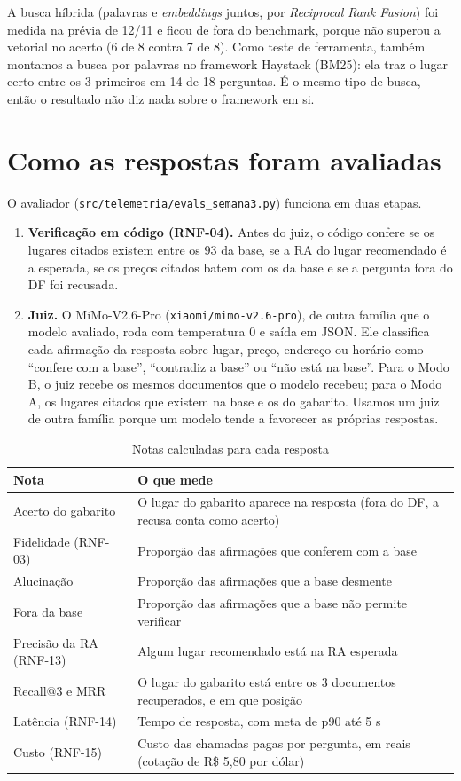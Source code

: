 \documentclass[11pt,a4paper]{article}
\newcommand{\fonte}{\vspace{0.1cm}\flushleft{\footnotesize{Fonte: elaborado pelos autores (2026).}}}
\newcommand{\codigo}[1]{\texttt{\small #1}}
\begin{document}
A busca híbrida (palavras e \textit{embeddings} juntos, por \textit{Reciprocal Rank Fusion}) foi medida na prévia de 12/11 e ficou de fora do benchmark, porque não superou a vetorial no acerto (6 de 8 contra 7 de 8). Como teste de ferramenta, também montamos a busca por palavras no framework Haystack (BM25): ela traz o lugar certo entre os 3 primeiros em 14 de 18 perguntas. É o mesmo tipo de busca, então o resultado não diz nada sobre o framework em si.

\section{Como as respostas foram avaliadas}

O avaliador (\codigo{src/telemetria/evals\_semana3.py}) funciona em duas etapas.

\begin{enumerate}
\item \textbf{Verificação em código (RNF-04).} Antes do juiz, o código confere se os lugares citados existem entre os 93 da base, se a RA do lugar recomendado é a esperada, se os preços citados batem com os da base e se a pergunta fora do DF foi recusada.
\item \textbf{Juiz.} O MiMo-V2.6-Pro (\codigo{xiaomi/mimo-v2.6-pro}), de outra família que o modelo avaliado, roda com temperatura 0 e saída em JSON. Ele classifica cada afirmação da resposta sobre lugar, preço, endereço ou horário como ``confere com a base'', ``contradiz a base'' ou ``não está na base''. Para o Modo B, o juiz recebe os mesmos documentos que o modelo recebeu; para o Modo A, os lugares citados que existem na base e os do gabarito. Usamos um juiz de outra família porque um modelo tende a favorecer as próprias respostas.
\end{enumerate}

\begin{table}[!htbp]
\centering
\small
\renewcommand{\arraystretch}{1.03}
\caption{Notas calculadas para cada resposta}
\label{tab:notas}
\begin{tabularx}{\textwidth}{p{4.4cm} L}
\toprule
\textbf{Nota} & \textbf{O que mede} \\
\midrule
Acerto do gabarito & O lugar do gabarito aparece na resposta (fora do DF, a recusa conta como acerto) \\
Fidelidade (RNF-03) & Proporção das afirmações que conferem com a base \\
Alucinação & Proporção das afirmações que a base desmente \\
Fora da base & Proporção das afirmações que a base não permite verificar \\
Precisão da RA (RNF-13) & Algum lugar recomendado está na RA esperada \\
Recall@3 e MRR & O lugar do gabarito está entre os 3 documentos recuperados, e em que posição \\
Latência (RNF-14) & Tempo de resposta, com meta de p90 até 5 s \\
Custo (RNF-15) & Custo das chamadas pagas por pergunta, em reais (cotação de R\$ 5,80 por dólar) \\
\bottomrule
\end{tabularx}
\fonte
\end{table}
\end{document}
